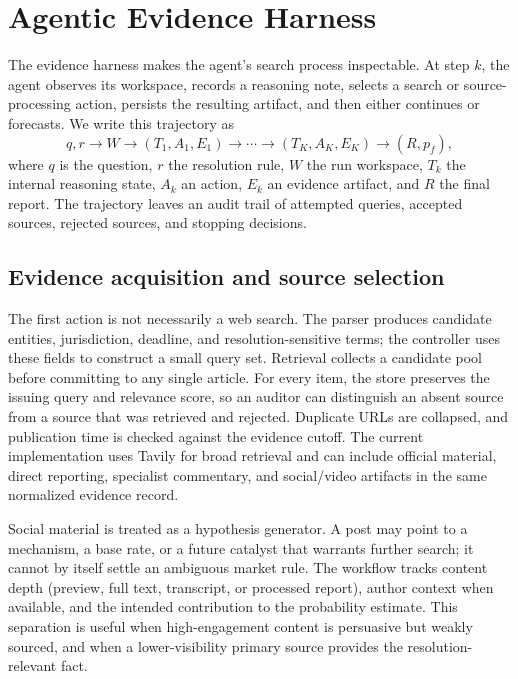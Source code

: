 \section{Agentic Evidence Harness}

The evidence harness makes the agent's search process inspectable. At step $k$, the agent observes its workspace, records a reasoning note, selects a search or source-processing action, persists the resulting artifact, and then either continues or forecasts. We write this trajectory as
\[
q, r \rightarrow W \rightarrow (T_1, A_1, E_1) \rightarrow \cdots \rightarrow (T_K, A_K, E_K) \rightarrow (R, p_f),
\]
where $q$ is the question, $r$ the resolution rule, $W$ the run workspace, $T_k$ the internal reasoning state, $A_k$ an action, $E_k$ an evidence artifact, and $R$ the final report. The trajectory leaves an audit trail of attempted queries, accepted sources, rejected sources, and stopping decisions.

\subsection{Evidence acquisition and source selection}

The first action is not necessarily a web search. The parser produces candidate entities, jurisdiction, deadline, and resolution-sensitive terms; the controller uses these fields to construct a small query set. Retrieval collects a candidate pool before committing to any single article. For every item, the store preserves the issuing query and relevance score, so an auditor can distinguish an absent source from a source that was retrieved and rejected. Duplicate URLs are collapsed, and publication time is checked against the evidence cutoff. The current implementation uses Tavily for broad retrieval and can include official material, direct reporting, specialist commentary, and social/video artifacts in the same normalized evidence record.

Social material is treated as a hypothesis generator. A post may point to a mechanism, a base rate, or a future catalyst that warrants further search; it cannot by itself settle an ambiguous market rule. The workflow tracks content depth (preview, full text, transcript, or processed report), author context when available, and the intended contribution to the probability estimate. This separation is useful when high-engagement content is persuasive but weakly sourced, and when a lower-visibility primary source provides the resolution-relevant fact.

